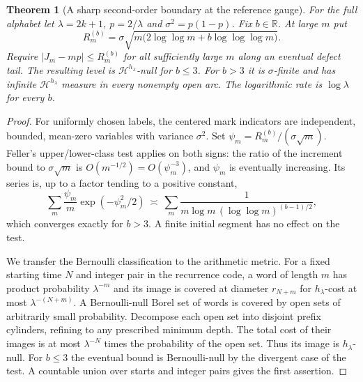 \documentclass[11pt]{article}
\newtheorem{theorem}{Theorem}
\theoremstyle{definition}
\theoremstyle{remark}
\newcommand{\R}{\mathbb{R}}
\begin{document}
\begin{theorem}[A sharp second-order boundary at the reference gauge]
\label{thm:frequency-upper-class}
For the full alphabet let $\lambda=2k+1$, $p=2/\lambda$ and
$\sigma^2=p(1-p)$. Fix $b\in\R$. At large $m$ put
\[
 R^{(b)}_m=\sigma\sqrt{m\bigl(2\log\log m+
                                      b\log\log\log m\bigr)}.
\]
Require $|J_m-mp|\le R^{(b)}_m$ for all sufficiently large $m$
along an eventual defect tail. The resulting level is
$\mathcal H^{h_\lambda}$-null for $b\le3$.
For $b>3$ it is $\sigma$-finite and has infinite
$\mathcal H^{h_\lambda}$ measure in every nonempty open arc.
The logarithmic rate is $\log\lambda$ for every $b$.
\end{theorem}
\begin{proof}
For uniformly chosen labels, the centered mark indicators are
independent, bounded, mean-zero variables with variance $\sigma^2$.
Set $\psi_m=R^{(b)}_m/(\sigma\sqrt m)$.
Feller's upper/lower-class test \cite[Theorem~2]{Feller1943}
applies on both signs: the ratio of the increment bound to
$\sigma\sqrt m$ is $O(m^{-1/2})=O(\psi_m^{-3})$, and
$\psi_m$ is eventually increasing. Its series is, up to a factor
tending to a positive constant,
\[
 \sum_m\frac{\psi_m}{m}\exp(-\psi_m^2/2)
 \ \asymp\
 \sum_m\frac{1}{m\log m\,(\log\log m)^{(b-1)/2}},
\]
which converges exactly for $b>3$. A finite initial segment has no
effect on the test.

We transfer the Bernoulli classification to the arithmetic metric.
For a fixed starting time $N$ and integer pair in the recurrence
code, a word of length $m$ has product probability $\lambda^{-m}$
and its image is covered at diameter $r_{N+m}$ for
$h_\lambda$-cost at most $\lambda^{-(N+m)}$.
A Bernoulli-null Borel set of words is covered by open sets of
arbitrarily small probability. Decompose each open set into
disjoint prefix cylinders, refining to any prescribed minimum depth.
The total cost of their images is at most $\lambda^{-N}$ times the
probability of the open set. Thus its image is $h_\lambda$-null.
For $b\le3$ the eventual bound is Bernoulli-null by the divergent
case of the test. A countable union over starts and integer pairs
gives the first assertion.


\end{proof}
\end{document}

